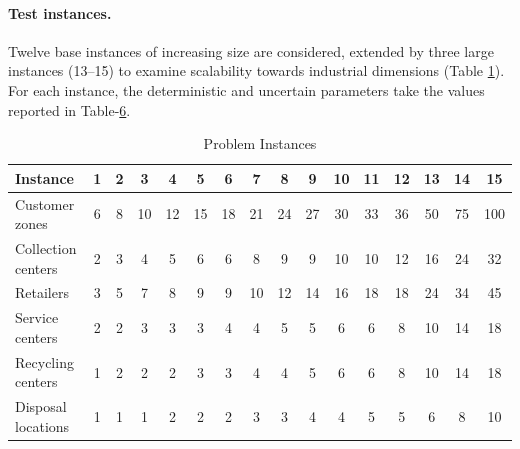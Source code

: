 \documentclass[11pt, a4paper]{article}
\begin{document}
\paragraph{Test instances.}Twelve base instances of increasing size are considered, extended by three large instances (13--15) to examine
scalability towards industrial dimensions (Table \ref{tab:Instances}). For each instance, the deterministic and uncertain parameters take the values reported in Table-\protect\hyperlink{tab:Values}{6}.

\hypertarget{tab:Instances}{}
\begin{table}[!htb]
	\caption{Problem Instances}
    \centering
    \footnotesize
    \renewcommand{\arraystretch}{1.25}
	\begin{tabular}{@{}lccccccccccccccc@{}}
		\toprule
		Instance & 1 & 2 & 3 & 4 & 5 & 6 & 7 & 8 & 9 & 10 & 11 & 12 & 13 & 14 & 15\\
		\midrule
		Customer zones      & 6 & 8 & 10 & 12 & 15 & 18 & 21 & 24 & 27 & 30 & 33 & 36 & 50 & 75 & 100\\
		Collection centers  & 2 & 3 & 4  & 5  & 6  & 6  & 8  & 9  & 9  & 10 & 10 & 12 & 16 & 24 & 32\\
		Retailers           & 3 & 5 & 7  & 8  & 9  & 9  & 10 & 12 & 14 & 16 & 18 & 18 & 24 & 34 & 45\\
		Service centers     & 2 & 2 & 3  & 3  & 3  & 4  & 4  & 5  & 5  & 6  & 6  & 8  & 10 & 14 & 18\\
		Recycling centers   & 1 & 2 & 2  & 2  & 3  & 3  & 4  & 4  & 5  & 6  & 6  & 8  & 10 & 14 & 18\\
		Disposal locations  & 1 & 1 & 1  & 2  & 2  & 2  & 3  & 3  & 4  & 4  & 5  & 5  & 6  & 8  & 10\\
		\bottomrule
	\end{tabular}
	\label{tab:Instances}
\end{table}
\hypertarget{tab:Values}{}
\end{document}
